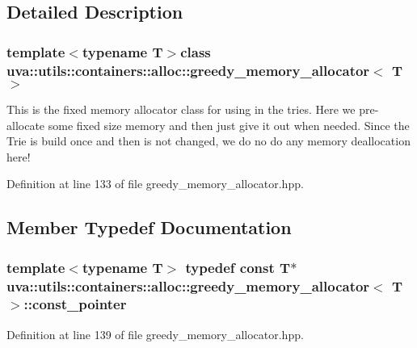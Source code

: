 \subsection{Detailed Description}
\subsubsection*{template$<$typename T$>$class uva\+::utils\+::containers\+::alloc\+::greedy\+\_\+memory\+\_\+allocator$<$ T $>$}

This is the fixed memory allocator class for using in the tries. Here we pre-\/allocate some fixed size memory and then just give it out when needed. Since the Trie is build once and then is not changed, we do no do any memory deallocation here! 

Definition at line 133 of file greedy\+\_\+memory\+\_\+allocator.\+hpp.



\subsection{Member Typedef Documentation}
\hypertarget{classuva_1_1utils_1_1containers_1_1alloc_1_1greedy__memory__allocator_afa247377962d665cc91b5d761cb923c4}{}
\subsubsection[{const\+\_\+pointer}]{\setlength{\rightskip}{0pt plus 5cm}template$<$typename T$>$ typedef const T$\ast$ {\bf uva\+::utils\+::containers\+::alloc\+::greedy\+\_\+memory\+\_\+allocator}$<$ T $>$\+::{\bf const\+\_\+pointer}}\label{classuva_1_1utils_1_1containers_1_1alloc_1_1greedy__memory__allocator_afa247377962d665cc91b5d761cb923c4}


Definition at line 139 of file greedy\+\_\+memory\+\_\+allocator.\+hpp.

\hypertarget{classuva_1_1utils_1_1containers_1_1alloc_1_1greedy__memory__allocator_aaff0778ffef1cc6b18f8135ec663fe14}{}
